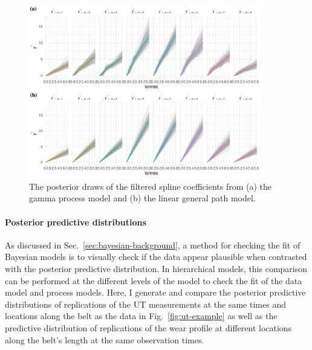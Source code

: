 \begin{figure}
  \centering
  \includegraphics[width=0.9\textwidth]{figures/ch-6/post_y_belt_wear.pdf}
  \caption{The posterior draws of the filtered spline coefficients from (a) the gamma process model and (b) the linear general path model.}
  \label{fig:y-post-beltwear}
\end{figure}

\paragraph{Posterior predictive distributions}

As discussed in Sec.~\ref{sec:bayesian-background}, a method for checking the fit of Bayesian models is to visually check if the data appear plausible when contrasted with the posterior predictive distribution. In hierarchical models, this comparison can be performed at the different levels of the model to check the fit of the data model and process models. Here, I generate and compare the posterior predictive distributions of replications of the UT measurements at the same times and locations along the belt as the data in Fig.~\ref{fig:ut-example} as well as the predictive distribution of replications of the wear profile at different locations along the belt's length at the same observation times.

